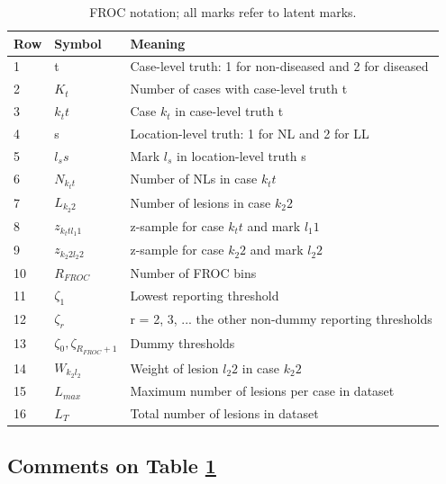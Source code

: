 \documentclass[
]{book}
\begin{document}
\begin{table}

\caption{\label{tab:froc-empirical-notation}FROC notation; all marks refer to latent marks.}
\centering
\begin{tabular}[t]{l|l|l}
\hline
Row & Symbol & Meaning\\
\hline
1 & t & Case-level truth: 1 for non-diseased and 2 for diseased\\
\hline
2 & $K_t$ & Number of cases with case-level truth t\\
\hline
3 & $k_t t$ & Case $k_t$ in case-level truth t\\
\hline
4 & s & Location-level truth: 1 for NL and 2 for LL\\
\hline
5 & $l_s s$ & Mark $l_s$ in location-level truth s\\
\hline
6 & $N_{k_t t}$ & Number of NLs in case $k_t t$\\
\hline
7 & $L_{k_2 2}$ & Number of lesions in case $k_2 2$\\
\hline
8 & $z_{k_t t l_1 1}$ & z-sample for case $k_t t$ and mark $l_1 1$\\
\hline
9 & $z_{k_2 2 l_2 2}$ & z-sample for case $k_2 2$ and mark $l_2 2$\\
\hline
10 & $R_{FROC}$ & Number of FROC bins\\
\hline
11 & $\zeta_1$ & Lowest reporting threshold\\
\hline
12 & $\zeta_r$ & r = 2, 3, ... the other non-dummy reporting thresholds\\
\hline
13 & $\zeta_0, \zeta_{R_{FROC}+1}$ & Dummy thresholds\\
\hline
14 & $W_{k_2 l_2}$ & Weight of lesion $l_2 2$ in case $k_2 2$\\
\hline
15 & $L_{max}$ & Maximum number of lesions per case in dataset\\
\hline
16 & $L_T$ & Total number of lesions in dataset\\
\hline
\end{tabular}
\end{table}

\hypertarget{comments-on-table-reftabfroc-empirical-notation}{%
\subsection{Comments on Table \ref{tab:froc-empirical-notation}}\label{comments-on-table-reftabfroc-empirical-notation}}
\end{document}
